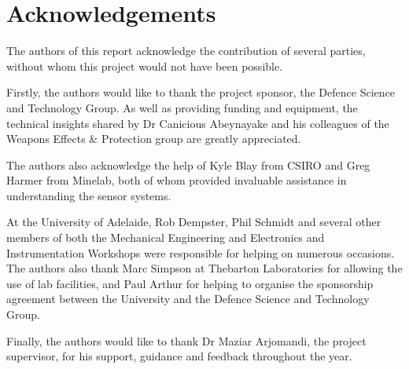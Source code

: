 \documentclass[main.tex]{subfiles}
\begin{document}
{}	%
\chapter*{Acknowledgements} 
The authors of this report acknowledge the contribution of several parties, without whom this project would not have been possible.

Firstly, the authors would like to thank the project sponsor, the Defence Science and Technology Group. As well as providing funding and equipment, the technical insights shared by Dr Canicious Abeynayake and his colleagues of the Weapons Effects \& Protection group are greatly appreciated. 

The authors also acknowledge the help of Kyle Blay from CSIRO and Greg Harmer from Minelab, both of whom provided invaluable assistance in understanding the sensor systems.

At the University of Adelaide, Rob Dempster, Phil Schmidt and several other members of both the Mechanical Engineering and Electronics and Instrumentation Workshops were responsible for helping on numerous occasions. The authors also thank Marc Simpson at Thebarton Laboratories for allowing the use of lab facilities, and Paul Arthur for helping to organise the sponsorship agreement between the University and the Defence Science and Technology Group. 

Finally, the authors would like to thank Dr Maziar Arjomandi, the project supervisor, for his support, guidance and feedback throughout the year. 
\newpage

{}	%
\renewcommand{\baselinestretch}{1.2}\normalsize 	%
\tableofcontents
\renewcommand{\baselinestretch}{1.3}\normalsize 	%
\newpage

{}	%
\listoffigures
\newpage

{}	%
\listoftables
\newpage


\renewcommand{\nomname}{List of Acronyms}
\printnomenclature
\newpage
\end{document}
